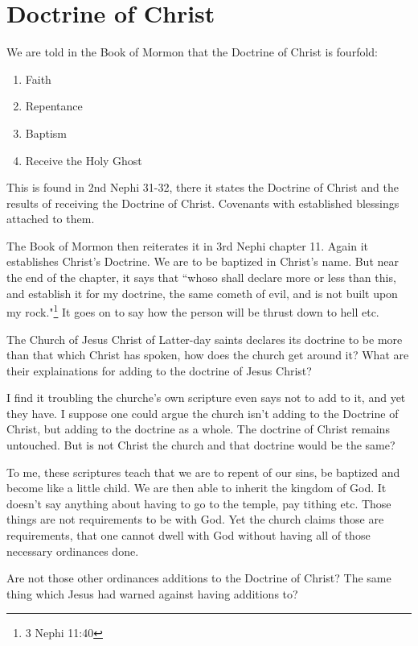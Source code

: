 \chapter{Doctrine of Christ}

We are told in the Book of Mormon that the Doctrine of Christ is fourfold:

\begin{enumerate}
  \item Faith
  \item Repentance
  \item Baptism
  \item Receive the Holy Ghost
\end{enumerate}

This is found in 2nd Nephi 31-32, there it states the Doctrine of Christ and the
results of receiving the Doctrine of Christ. Covenants with established blessings
attached to them.

The Book of Mormon then reiterates it in 3rd Nephi chapter 11. Again it establishes
Christ's Doctrine. We are to be baptized in Christ's name. But near the end of the
chapter, it says that ``whoso shall declare more or less than this, and establish it
for my doctrine, the same cometh of evil, and is not built upon my rock."\footnote{
3 Nephi 11:40
} It goes on to say how the person will be thrust down to hell etc.

The Church of Jesus Christ of Latter-day saints declares its doctrine to be more than
that which Christ has spoken, how does the church get around it? What are their
explainations for adding to the doctrine of Jesus Christ?

I find it troubling the churche's own scripture even says not to add to it, and yet
they have. I suppose one could argue the church isn't adding to the Doctrine of
Christ, but adding to the doctrine as a whole. The doctrine of Christ remains
untouched. But is not Christ the church and that doctrine would be the same?

To me, these scriptures teach that we are to repent of our sins, be baptized and
become like a little child. We are then able to inherit the kingdom of God. It
doesn't say anything about having to go to the temple, pay tithing etc. Those things
are not requirements to be with God. Yet the church claims those are requirements,
that one cannot dwell with God without having all of those necessary ordinances done.

Are not those other ordinances additions to the Doctrine of Christ? The same thing
which Jesus had warned against having additions to?

